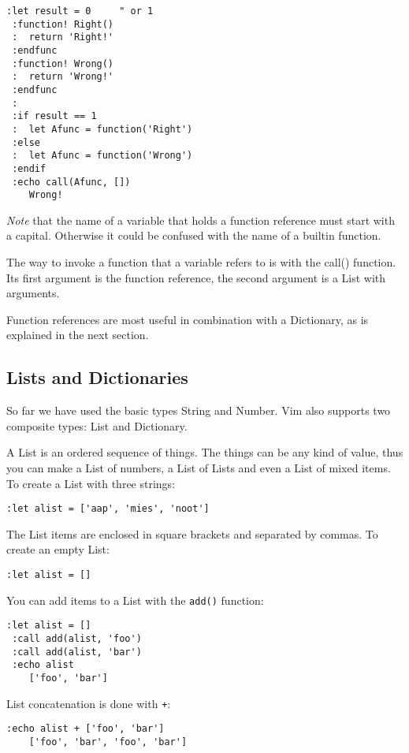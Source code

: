 \begin{Verbatim}[samepage=true]
 :let result = 0     " or 1
 :function! Right()
 :  return 'Right!'
 :endfunc
 :function! Wrong()
 :  return 'Wrong!'
 :endfunc
 :
 :if result == 1
 :  let Afunc = function('Right')
 :else
 :  let Afunc = function('Wrong')
 :endif
 :echo call(Afunc, [])
    Wrong!
\end{Verbatim}

\emph{Note} that the name of a variable that holds a function reference must start with a capital.
Otherwise it could be confused with the name of a builtin function.

The way to invoke a function that a variable refers to is with the call() function.
Its first argument is the function reference, the second argument is a List with arguments.

Function references are most useful in combination with a Dictionary, as is explained in the next section.
\subsection{Lists and Dictionaries}
\label{Lists and Dictionaries}
So far we have used the basic types String and Number.
Vim also supports two composite types: List and Dictionary.

A List is an ordered sequence of things.
The things can be any kind of value, thus you can make a List of numbers, a List of Lists and even a List of mixed items.
To create a List with three strings:

\begin{Verbatim}[samepage=true]
 :let alist = ['aap', 'mies', 'noot']
\end{Verbatim}

The List items are enclosed in square brackets and separated by commas.
To create an empty List:

\begin{Verbatim}[samepage=true]
 :let alist = []
\end{Verbatim}

You can add items to a List with the \verb!add()! function:

\begin{Verbatim}[samepage=true]
 :let alist = []
 :call add(alist, 'foo')
 :call add(alist, 'bar')
 :echo alist
    ['foo', 'bar']
\end{Verbatim}

List concatenation is done with \verb!+!:

\begin{Verbatim}[samepage=true]
 :echo alist + ['foo', 'bar']
    ['foo', 'bar', 'foo', 'bar']
\end{Verbatim}

